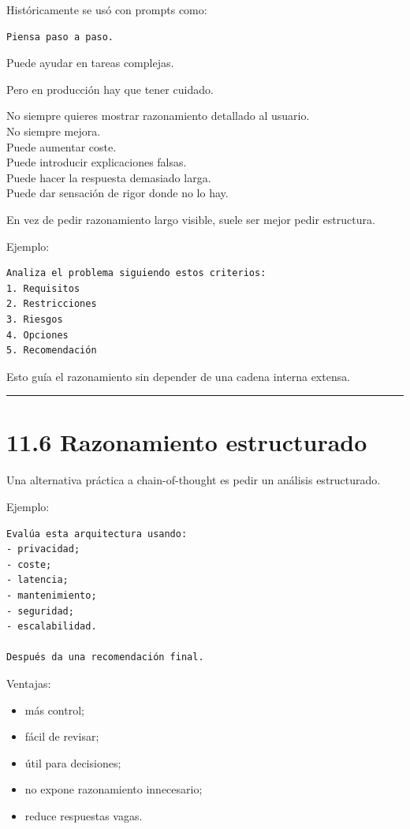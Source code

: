 Históricamente se usó con prompts como:

\begin{lstlisting}
Piensa paso a paso.
\end{lstlisting}

Puede ayudar en tareas complejas.

Pero en producción hay que tener cuidado.

No siempre quieres mostrar razonamiento detallado al usuario.\\
No siempre mejora.\\
Puede aumentar coste.\\
Puede introducir explicaciones falsas.\\
Puede hacer la respuesta demasiado larga.\\
Puede dar sensación de rigor donde no lo hay.

En vez de pedir razonamiento largo visible, suele ser mejor pedir
estructura.

Ejemplo:

\begin{lstlisting}
Analiza el problema siguiendo estos criterios:
1. Requisitos
2. Restricciones
3. Riesgos
4. Opciones
5. Recomendación
\end{lstlisting}

Esto guía el razonamiento sin depender de una cadena interna extensa.

\begin{center}\rule{0.5\linewidth}{0.5pt}\end{center}

\section{11.6 Razonamiento
estructurado}\label{razonamiento-estructurado}

Una alternativa práctica a chain-of-thought es pedir un análisis
estructurado.

Ejemplo:

\begin{lstlisting}
Evalúa esta arquitectura usando:
- privacidad;
- coste;
- latencia;
- mantenimiento;
- seguridad;
- escalabilidad.

Después da una recomendación final.
\end{lstlisting}

Ventajas:

\begin{itemize}
\tightlist
\item
  más control;
\item
  fácil de revisar;
\item
  útil para decisiones;
\item
  no expone razonamiento innecesario;
\item
  reduce respuestas vagas.
\end{itemize}

